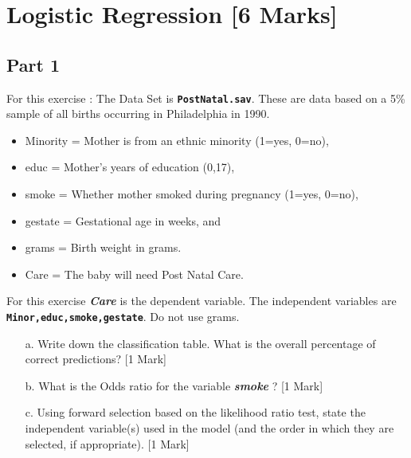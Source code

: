 \documentclass[12pt, a4paper]{article}
\theoremstyle{plain}
\theoremstyle{definition}
\theoremstyle{remark}
\begin{document}
\newpage
\section{Logistic Regression [6 Marks]}   %
\subsection{Part 1}

For this exercise : The Data Set is \textbf{\texttt{PostNatal.sav}}.
These are data based on a 5\% sample of all births occurring in Philadelphia in 1990.

\begin{itemize}
\item Minority = Mother is from an ethnic minority (1=yes, 0=no),
\item educ = Mother's years of education (0,17),
\item smoke = Whether mother smoked during pregnancy (1=yes, 0=no),
\item gestate = Gestational age in weeks, and
\item grams = Birth weight in grams.
\item Care = The baby will need Post Natal Care.
\end{itemize}

For this exercise \textbf{\textit{Care}} is the dependent variable. The independent variables are \textbf{\texttt{Minor,educ,smoke,gestate}}. Do not use grams.
\begin{itemize}
\item[a.] Write down the classification table. What is the overall percentage of correct predictions? [1 Mark]
\item[b.] What is the Odds ratio for the variable \textbf{\textit{smoke}} ? [1 Mark]
\item[c.] Using forward selection based on the likelihood ratio test, state the independent variable(s) used in the model (and the order in which they are selected, if appropriate). [1 Mark]
\end{itemize}
\newpage
\end{document}
